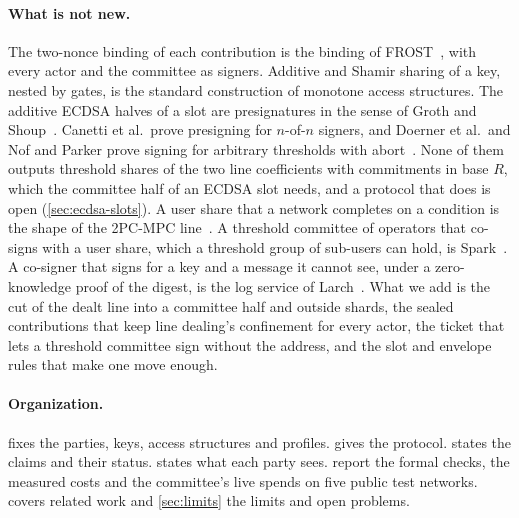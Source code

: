 \paragraph{What is not new.} The two-nonce binding of each contribution is the binding of FROST~\cite{FROST,RFC9591}, with every actor and the committee as signers. Additive and Shamir sharing of a key, nested by gates, is the standard construction of monotone access structures. The additive ECDSA halves of a slot are presignatures in the sense of Groth and Shoup~\cite{GS21}. Canetti et al.\ prove presigning for $n$-of-$n$ signers, and Doerner et al.\ and Nof and Parker prove signing for arbitrary thresholds with abort~\cite{CGGMP21,DKLs23,TroutPP}. None of them outputs threshold shares of the two line coefficients with commitments in base $R$, which the committee half of an ECDSA slot needs, and a protocol that does is open (\cref{sec:ecdsa-slots}). A user share that a network completes on a condition is the shape of the 2PC-MPC line~\cite{TwoPCMPC,FMMSS25,IkaDocs}. A threshold committee of operators that co-signs with a user share, which a threshold group of sub-users can hold, is Spark~\cite{Spark}. A co-signer that signs for a key and a message it cannot see, under a zero-knowledge proof of the digest, is the log service of Larch~\cite{Larch}. What we add is the cut of the dealt line into a committee half and outside shards, the sealed contributions that keep line dealing's confinement for every actor, the ticket that lets a threshold committee sign without the address, and the slot and envelope rules that make one move enough.

\paragraph{Organization.}  fixes the parties, keys, access structures and profiles.  gives the protocol.  states the claims and their status.  states what each party sees.  report the formal checks, the measured costs and the committee's live spends on five public test networks.  covers related work and \cref{sec:limits} the limits and open problems.
